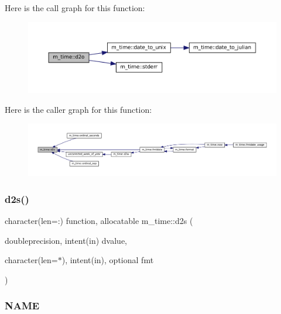 Here is the call graph for this function\+:\nopagebreak
\begin{figure}[H]
\begin{center}
\leavevmode
\includegraphics[width=350pt]{namespacem__time_a727dd77bbd4a5d0e3947c5d303845947_cgraph}
\end{center}
\end{figure}
Here is the caller graph for this function\+:\nopagebreak
\begin{figure}[H]
\begin{center}
\leavevmode
\includegraphics[width=350pt]{namespacem__time_a727dd77bbd4a5d0e3947c5d303845947_icgraph}
\end{center}
\end{figure}
\mbox{\label{namespacem__time_a0b88094db657df167f8e57aa4362259e}} 
\subsubsection{\texorpdfstring{d2s()}{d2s()}}
{\footnotesize\ttfamily character(len=\+:) function, allocatable m\+\_\+time\+::d2s (\begin{DoxyParamCaption}\item[{doubleprecision, intent(in)}]{dvalue,  }\item[{character(len=$\ast$), intent(in), optional}]{fmt }\end{DoxyParamCaption})\hspace{0.3cm}{\ttfamily [private]}}



\subsubsection*{N\+A\+ME}

